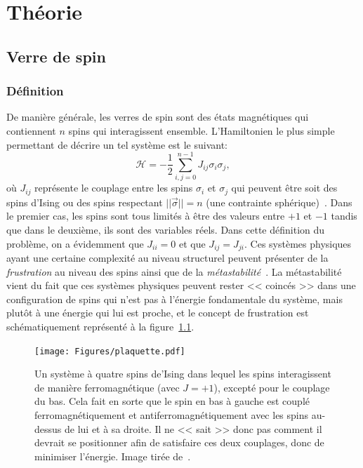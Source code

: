 \part{Théorie}\label{part:theory}

\chapter{Verre de spin} \label{ch:spin-glass}
\section{Définition} \label{sec:spin-glass}
De manière générale, les verres de spin sont des états magnétiques qui contiennent $n$ spins qui interagissent ensemble.
L'Hamiltonien le plus simple permettant de décrire un tel système est le suivant:
\begin{equation}
    \mathcal{H} = -\frac{1}{2}\sum_{i,j = 0}^{n-1}J_{ij}\sigma_i\sigma_j,
\end{equation}
où $J_{ij}$ représente le couplage entre les spins $\sigma_i$ et $\sigma_j$ qui peuvent être soit des spins d'Ising ou des spins respectant $||\vec{\sigma}|| = n$ (une contrainte sphérique)~\cite{EAspinglass, spherical-model-spinglass}.
Dans le premier cas, les spins sont tous limités à être des valeurs entre $+1$ et $-1$ tandis que dans le deuxième, ils sont des variables réels.
Dans cette définition du problème, on a évidemment que $J_{ii} = 0$ et que $J_{ij} = J_{ji}$.
Ces systèmes physiques ayant une certaine complexité au niveau structurel peuvent présenter de la \emph{frustration} au niveau des spins ainsi que de la \emph{métastabilité}~\cite{stein2013spin}.
La métastabilité vient du fait que ces systèmes physiques peuvent rester << coincés >> dans une configuration de spins qui n'est pas à l'énergie fondamentale du système, mais plutôt à une énergie qui lui est proche, et le concept de frustration est schématiquement représenté à la figure~\ref{fig:spin-glass-frustration}.
\begin{figure}[h]
    \centering
    \texttt{[image: Figures/plaquette.pdf]}
    \caption[Un système à quatre spins d'Ising dans lequel les spins interagissent de manière ferromagnétique (avec $J = +1$), excepté pour le couplage du bas.]{Un système à quatre spins de'Ising dans lequel les spins interagissent de manière ferromagnétique (avec $J = +1$), excepté pour le couplage du bas. Cela fait en sorte que le spin en bas à gauche est couplé ferromagnétiquement et antiferromagnétiquement avec les spins au-dessus de lui et à sa droite. Il ne << sait >> donc pas comment il devrait se positionner afin de satisfaire ces deux couplages, donc de minimiser l'énergie. Image tirée de~\protect\cite{altieri2023introduction}.}
    \label{fig:spin-glass-frustration}
\end{figure}
